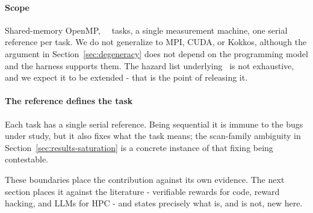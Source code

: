 \paragraph*{Scope}
Shared-memory OpenMP, \NTasks\ \ParEval\ tasks, a single measurement machine, one
serial reference per task. We do not generalize to MPI, CUDA, or Kokkos,
although the argument in Section~\ref{sec:degeneracy} does not depend on the
programming model and the harness supports them. The hazard list underlying
\PG\ is not exhaustive, and we expect it to be extended - that is the point of
releasing it.

\paragraph*{The reference defines the task}
Each task has a single serial reference. Being sequential it is immune to the
bugs under study, but it also fixes what the task means; the scan-family
ambiguity in Section~\ref{sec:results-saturation} is a concrete instance of
that fixing being contestable.

These boundaries place the contribution against its own evidence. The next
section places it against the literature - verifiable rewards for code, reward
hacking, and LLMs for HPC - and states precisely what is, and is not, new here.
